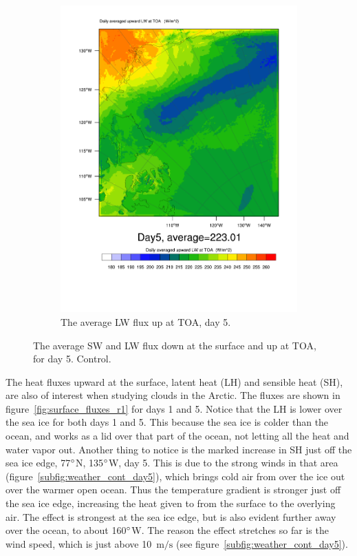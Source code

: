 \begin{figure}
\begin{subfigure}{0.48\textwidth}
		\includegraphics[width=\textwidth]{results/control/LWUPT_Day5.pdf}
		\caption{The average LW flux up at TOA, day 5.}
		\label{subfig:lwup_r1Day5}
	\end{subfigure}
	\caption{The average SW and LW flux down at the surface and up at TOA, for day 5. Control.}
	\label{fig:radiation_r1Day5}
\end{figure}


The heat fluxes upward at the surface, latent heat (LH) and sensible heat (SH), are also of interest when studying clouds in the Arctic. The fluxes are shown in figure~\ref{fig:surface_fluxes_r1} for days 1 and 5. Notice that the LH is lower over the sea ice for both days 1 and 5. This because the sea ice is colder than the ocean, and works as a lid over that part of the ocean, not letting all the heat and water vapor out. Another thing to notice is the marked increase in SH just off the sea ice edge, 77$\degree$N, 135$\degree$W, day 5. This is due to the strong winds in that area (figure~\ref{subfig:weather_cont_day5}), which brings cold air from over the ice out over the warmer open ocean. Thus the temperature gradient is stronger just off the sea ice edge, increasing the heat given to from the surface to the overlying air. The effect is strongest at the sea ice edge, but is also evident further away over the ocean, to about 160$\degree$W. The reason the effect stretches so far is the wind speed, which is just above 10~$\text{m/s}$ (see figure~\ref{subfig:weather_cont_day5}).

